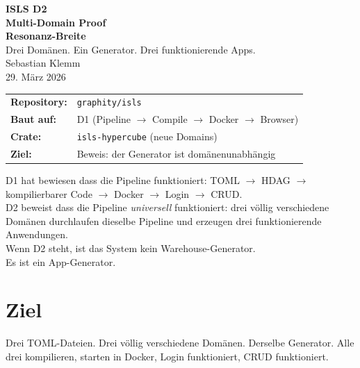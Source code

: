 \documentclass[11pt,a4paper]{article}
\begin{document}
\begin{titlepage}
\begin{center}
\vspace*{1.5cm}
{\Huge\bfseries ISLS D2}\\[0.4cm]
{\LARGE\bfseries Multi-Domain Proof}\\[0.3cm]
{\LARGE\bfseries Resonanz-Breite}\\[1.2cm]
{\Large Drei Dom\"anen. Ein Generator. Drei funktionierende Apps.}\\[1.5cm]
{\large Sebastian Klemm}\\[0.3cm]
{\small 29. M\"arz 2026}\\[2cm]

\begin{tabular}{ll}
\textbf{Repository:} & \texttt{graphity/isls} \\
\textbf{Baut auf:} & D1 (Pipeline $\to$ Compile $\to$ Docker $\to$ Browser) \\
\textbf{Crate:} & \texttt{isls-hypercube} (neue Domains) \\
\textbf{Ziel:} & Beweis: der Generator ist dom\"anenunabh\"angig \\
\end{tabular}

\vfill
{\small
D1 hat bewiesen dass die Pipeline funktioniert: TOML $\to$ HDAG $\to$
kompilierbarer Code $\to$ Docker $\to$ Login $\to$ CRUD.\\[0.2cm]
D2 beweist dass die Pipeline \emph{universell} funktioniert: drei
v\"ollig verschiedene Dom\"anen durchlaufen dieselbe Pipeline und
erzeugen drei funktionierende Anwendungen.\\[0.2cm]
Wenn D2 steht, ist das System kein Warehouse-Generator.\\
Es ist ein App-Generator.
}
\end{center}
\end{titlepage}

\tableofcontents
\newpage

\section{Ziel}

Drei TOML-Dateien. Drei v\"ollig verschiedene Dom\"anen. Derselbe Generator.
Alle drei kompilieren, starten in Docker, Login funktioniert, CRUD funktioniert.
\end{document}

